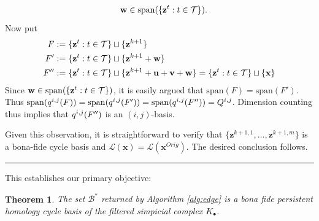 \documentclass[11pt,onecolumn]{article}
\newtheorem{theorem}{Theorem}[section] %
\newenvironment{proof}{{\em Proof:}}{\hfill{\hfill\rule{2mm}{2mm}}}
\newcommand{\originalrep}{\mathbf{x}^{Orig}}
\newcommand{\optimalrep}{\mathbf{x}}
\newcommand{\cycle}{{\mathbf z}}
\newcommand{\cyclea}{\mathbf{a}}
\newcommand{\cycleu}{\mathbf{u}}
\newcommand{\cyclev}{\mathbf{v}}
\newcommand{\cyclew}{\mathbf{w}}
\newcommand{\persinterval}{\mathcal{L}}
\newcommand{\spann}{{\mathrm{span}}}
\newcommand{\hcyclebasis}{\mathcal B}
\newcommand{\obasisel}{\mathbf{z}}  %
\theoremstyle{plain}
\theoremstyle{definition}
\begin{document}
\begin{proof}
\begin{align*}
        &&
        \cyclew \in \spann(\{\obasisel^t : t \in \orderset \}).
    \end{align*}
Now put
    \begin{align*}
        F &: = \{\obasisel^t : t \in \orderset \} \sqcup \{\obasisel^{k+1}\}\\
        F' &: = \{\obasisel^t : t \in \orderset \} \sqcup\{\obasisel^{k+1} + \cyclew\} \\
        F'' &: = \{\obasisel^t : t \in \orderset \} \sqcup\{\obasisel^{k+1} + \cycleu + \cyclev + \cyclew\} =  \{\obasisel^t : t \in \orderset \} \sqcup \{\optimalrep\}\\        
    \end{align*}
Since $\cyclew \in \spann(\{\obasisel^t : t \in \orderset \})$, it is easily argued that $\spann(F) = \spann(F')$.  Thus $\spann(\qij(F))=\spann(\qij(F'))=\spann(\qij(F'')) = \Qij$.  Dimension counting thus implies that $q^{i, j}(F'')$ is an $(i,j)$-basis.  
    
Given this observation, it is straightforward to verify that $\{\obasisel^{k+1, 1}, \ldots, \obasisel^{k+1, m} \}$ is a bona-fide cycle basis and $\persinterval(\optimalrep) = \persinterval(\originalrep)$.  The desired conclusion follows.
\end{proof}

This establishes our primary objective:

\begin{theorem}
The set $\hcyclebasis^*$ returned by Algorithm \ref{alg:edge} is a bona fide persistent homology cycle basis of the filtered simpicial complex $K_\bullet$.
\end{theorem}


\end{document}
